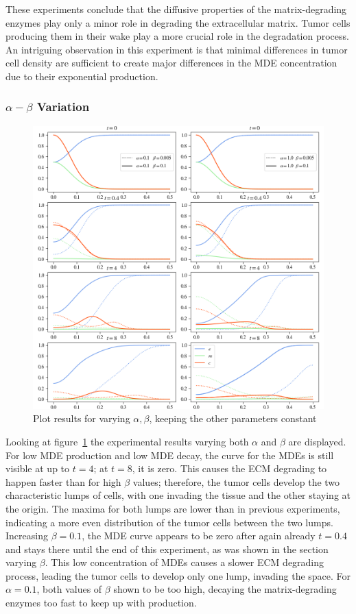 These experiments conclude that the diffusive properties of the matrix-degrading enzymes play only a minor role in degrading the extracellular matrix. Tumor cells producing them in their wake play a more crucial role in the degradation process. An intriguing observation in this experiment is that minimal differences in tumor cell density are sufficient to create major differences in the MDE concentration due to their exponential production.

\subsubsection*{$\alpha - \beta$ Variation}
\begin{figure}[h!]
    \centering
    \includegraphics[width=\textwidth]{resources/images/alpha_beta_variation.png}
    \caption{Plot results for varying $\alpha, \beta$, keeping the other parameters constant}
    \label{fig:alpha_beta_variation}
\end{figure}
Looking at figure~\ref{fig:alpha_beta_variation} the experimental results varying both $\alpha$ and $\beta$ are displayed. For low MDE production and low MDE decay, the curve for the MDEs is still visible at up to $t=4$; at $t=8$, it is zero. This causes the ECM degrading to happen faster than for high $\beta$ values; therefore, the tumor cells develop the two characteristic lumps of cells, with one invading the tissue and the other staying at the origin. The maxima for both lumps are lower than in previous experiments, indicating a more even distribution of the tumor cells between the two lumps. Increasing $\beta=0.1$, the MDE curve appears to be zero after again already $t=0.4$ and stays there until the end of this experiment, as was shown in the section varying $\beta$. This low concentration of MDEs causes a slower ECM degrading process, leading the tumor cells to develop only one lump, invading the space. For $\alpha=0.1$, both values of $\beta$ shown to be too high, decaying the matrix-degrading enzymes too fast to keep up with production.

